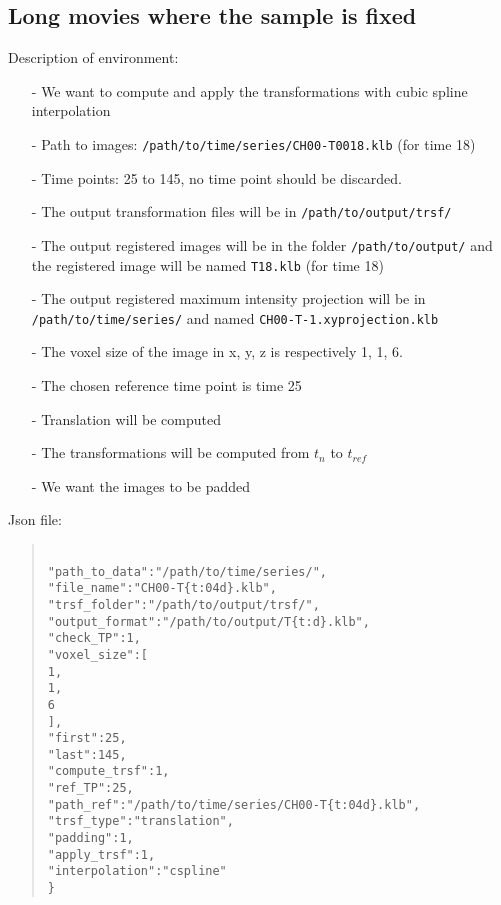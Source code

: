 \documentclass[10pt,a4paper]{book}
\newcommand\tab[1][.6cm]{\hspace*{#1}}
\newenvironment{code}[1]{\mbox{}\\[1ex]\hspace*{-#1cm}\begin{minipage}{150mm}\begin{quote}\tt}{\end{quote}\end{minipage}\mbox{}\\[1ex]}
\begin{document}
\subsection{Long movies where the sample is fixed}
Description of environment:
\begin{itemize}
\item[-] We want to compute and apply the transformations with cubic spline interpolation
\item[-] Path to images: \texttt{/path/to/time/series/CH00-T0018.klb} (for time 18)
\item[-] Time points: 25 to 145, no time point should be discarded.
\item[-] The output transformation files will be in \texttt{/path/to/output/trsf/}
\item[-] The output registered images will be in the folder \texttt{/path/to/output/} and the registered image will be named \texttt{T18.klb} (for time 18)
\item[-] The output registered maximum intensity projection will be in \texttt{/path/to/time/series/} and named \texttt{CH00-T-1.xyprojection.klb}
\item[-] The voxel size of the image in x, y, z is respectively 1, 1, 6.
\item[-] The chosen reference time point is time 25
\item[-] Translation will be computed
\item[-] The transformations will be computed from $t_n$ to $t_{ref}$
\item[-] We want the images to be padded
\end{itemize}
Json file:
\begin{code}{0.8}
\{\\
\tab"path\_to\_data":"/path/to/time/series/",\\
\tab"file\_name":"CH00-T\{t:04d\}.klb",\\
\tab"trsf\_folder":"/path/to/output/trsf/",\\
\tab"output\_format":"/path/to/output/T\{t:d\}.klb",\\
\tab"check\_TP":1,\\
\tab"voxel\_size":[\\
\tab\tab1,\\
\tab\tab1,\\
\tab\tab6\\
\tab],\\
\tab"first":25,\\
\tab"last":145,\\
\tab"compute\_trsf":1,\\
\tab"ref\_TP":25,\\
\tab"path\_ref":"/path/to/time/series/CH00-T\{t:04d\}.klb",\\
\tab"trsf\_type":"translation",\\
\tab"padding":1,\\
\tab"apply\_trsf":1,\\
\tab"interpolation":"cspline"\\
\}
\end{code}
\end{document}
